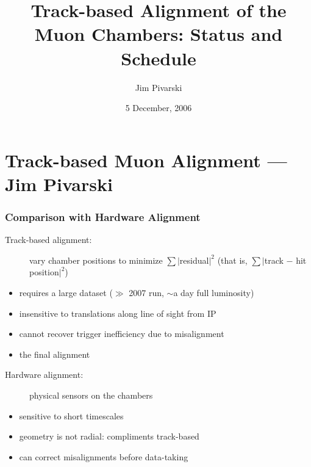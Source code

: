 \documentclass[compress]{beamer}
\title{Track-based Alignment of the Muon Chambers: Status and Schedule}
\author{Jim Pivarski}
\institute{Texas A\&M University}
\date{ 5 December, 2006}
\begin{document}
\frame{\titlepage}
\section*{Track-based Muon Alignment --- Jim Pivarski}

\begin{frame}
\frametitle{Comparison with Hardware Alignment}

\begin{description}
\item[Track-based alignment:] vary chamber positions to minimize $\sum |$residual$|^2$ (that is, $\sum |$track $-$ hit position$|^2$)
\end{description}
\begin{itemize}
\item<1-> requires a large dataset ($\gg$ 2007 run, $\sim$a day full luminosity)
\item<2-> insensitive to translations along line of sight from IP
\item<3-> cannot recover trigger inefficiency due to misalignment
\item<4-> the final alignment
\end{itemize}

\vfill
\begin{description}
\item[Hardware alignment:] physical sensors on the chambers
\end{description}
\begin{itemize}
\item<1-> sensitive to short timescales
\item<2-> geometry is not radial: compliments track-based
\item<3-> can correct misalignments before data-taking
\end{itemize}
\end{frame}
\end{document}
